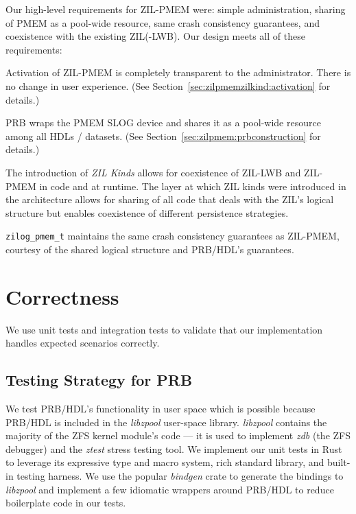 \documentclass[12pt,a4paper,twoside]{book}
\begin{document}
Our high-level requirements for ZIL-PMEM were: simple administration, sharing of PMEM as a pool-wide resource, same crash consistency guarantees, and coexistence with the existing ZIL(-LWB).
Our design meets all of these requirements:
\begin{description}[noitemsep]
    \item[Simple Administration] Activation of ZIL-PMEM is completely transparent to the administrator.
        There is no change in user experience.
        (See Section~\ref{sec:zilpmemzilkind:activation} for details.)
    \item[Pooled Storage] PRB wraps the PMEM SLOG device and shares it as a pool-wide resource among all HDLs / datasets.
        (See Section~\ref{sec:zilpmem:prbconstruction} for details.)
    \item[Coexistence] The introduction of \textit{ZIL Kinds} allows for coexistence of ZIL-LWB and ZIL-PMEM in code and at runtime.
        The layer at which ZIL kinds were introduced in the architecture allows for sharing of all code that deals with the ZIL's logical structure but enables coexistence of different persistence strategies.
    \item[Same Guarantees] \lstinline{zilog_pmem_t} maintains the same crash consistency guarantees as ZIL-PMEM, courtesy of the shared logical structure and PRB/HDL's guarantees.
\end{description}

\section{Correctness}

We use unit tests and integration tests to validate that our implementation handles expected scenarios correctly.

\subsection{Testing Strategy for PRB}

We test PRB/HDL's functionality in user space which is possible because PRB/HDL is included in the \textit{libzpool} user-space library.
\textit{libzpool} contains the majority of the ZFS kernel module's code --- it is used to implement \textit{zdb} (the ZFS debugger) and the \textit{ztest} stress testing tool.
We implement our unit tests in Rust to leverage its expressive type and macro system, rich standard library, and built-in testing harness.
We use the popular \textit{bindgen} crate to generate the bindings to \textit{libzpool} and implement a few idiomatic wrappers around PRB/HDL to reduce boilerplate code in our tests.
\end{document}
